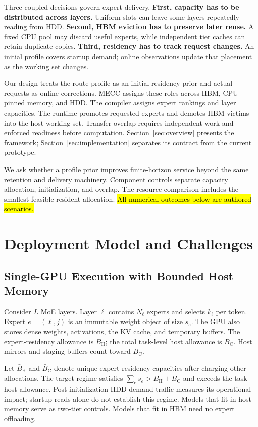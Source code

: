 \documentclass[conference,9pt,letterpaper]{IEEEtran}
\newcommand{\draftnote}[1]{{\sethlcolor{DraftYellow}\hl{#1}}}
\newcommand{\mecc}{\textsc{MECC}}
\newcommand{\BH}{B_{\mathrm H}}
\newcommand{\BC}{B_{\mathrm C}}
\begin{document}
Three coupled decisions govern expert delivery. \textbf{First, capacity has to be distributed across layers.} Uniform slots can leave some layers repeatedly reading from HDD. \textbf{Second, HBM eviction has to preserve later reuse.} A fixed CPU pool may discard useful experts, while independent tier caches can retain duplicate copies. \textbf{Third, residency has to track request changes.} An initial profile covers startup demand; online observations update that placement as the working set changes.

Our design treats the route profile as an initial residency prior and actual requests as online corrections. \mecc{} assigns these roles across HBM, CPU pinned memory, and HDD. The compiler assigns expert rankings and layer capacities. The runtime promotes requested experts and demotes HBM victims into the host working set. Transfer overlap requires independent work and enforced readiness before computation. Section~\ref{sec:overview} presents the framework; Section~\ref{sec:implementation} separates its contract from the current prototype.

We ask whether a profile prior improves finite-horizon service beyond the same retention and delivery machinery. Component controls separate capacity allocation, initialization, and overlap. The resource comparison includes the smallest feasible resident allocation. \draftnote{All numerical outcomes below are authored scenarios.}

\section{Deployment Model and Challenges}
\label{sec:challenges}
\subsection{Single-GPU Execution with Bounded Host Memory}
Consider $L$ MoE layers. Layer $\ell$ contains $N_\ell$ experts and selects $k_\ell$ per token. Expert $e=(\ell,j)$ is an immutable weight object of size $s_e$. The GPU also stores dense weights, activations, the KV cache, and temporary buffers. The expert-residency allowance is $\BH$; the total task-level host allowance is $\BC$. Host mirrors and staging buffers count toward $\BC$.

Let $\bar B_{\mathrm H}$ and $\bar B_{\mathrm C}$ denote unique expert-residency capacities after charging other allocations. The target regime satisfies $\sum_e s_e>\bar B_{\mathrm H}+\bar B_{\mathrm C}$ and exceeds the task host allowance. Post-initialization HDD demand traffic measures its operational impact; startup reads alone do not establish this regime. Models that fit in host memory serve as two-tier controls. Models that fit in HBM need no expert offloading.
\end{document}
